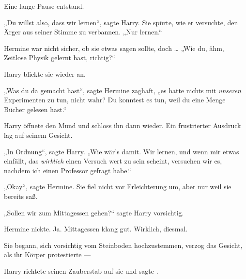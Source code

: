 Eine lange Pause entstand.

„Du willst also, dass wir lernen“, sagte Harry. Sie spürte, wie er versuchte, den Ärger aus seiner Stimme zu verbannen.
„Nur lernen.“

Hermine war nicht sicher, ob sie etwas sagen sollte, doch …
„Wie du, ähm, Zeitlose Physik gelernt hast, richtig?“

Harry blickte sie wieder an.

„Was du da gemacht hast“, sagte Hermine zaghaft, „es hatte nichts mit \emph{unseren} Experimenten zu tun, nicht wahr? Du konntest es tun, weil du eine Menge Bücher gelesen hast.“

Harry öffnete den Mund und schloss ihn dann wieder. Ein frustrierter Ausdruck lag auf seinem Gesicht.

„In Ordnung“, sagte Harry.
„Wie wär’s damit. Wir lernen, und wenn mir etwas einfällt, das \emph{wirklich} einen Versuch wert zu sein scheint, versuchen wir es, nachdem ich einen Professor gefragt habe.“

„Okay“, sagte Hermine. Sie fiel nicht vor Erleichterung um, aber nur weil sie bereits saß.

„Sollen wir zum Mittagessen gehen?“ sagte Harry vorsichtig.

Hermine nickte. Ja. Mittagessen klang gut. Wirklich, diesmal.

Sie begann, sich vorsichtig vom Steinboden hochzustemmen, verzog das Gesicht, als ihr Körper protestierte —

Harry richtete seinen Zauberstab auf sie und sagte .

